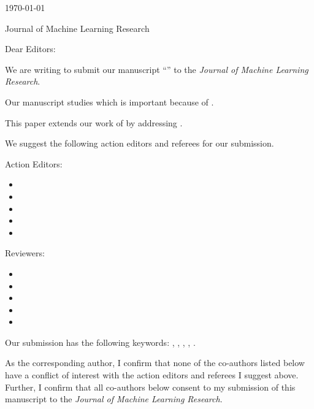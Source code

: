 


\hfill{\today}

Journal of Machine Learning Research

\bigskip

Dear Editors:

We are writing to submit our manuscript ``'' to the \emph{Journal of Machine Learning Research}.

Our manuscript studies  which is important because of .

This paper extends our work of  by addressing .

We suggest the following action editors and referees for our submission.

Action Editors:
\begin{itemize}
    \item {}
    \item {}
    \item {}
    \item {}
    \item {}
\end{itemize}

Reviewers:
\begin{itemize}
    \item {}
    \item {}
    \item {}
    \item {}
    \item {}
\end{itemize}

Our submission has the following keywords: , , , , .

As the corresponding author, I confirm that none of the co-authors listed below have a conflict of interest with the action editors and referees I suggest above. Further, I confirm that all co-authors below consent to my submission of this manuscript to the \emph{Journal of Machine Learning Research}.

